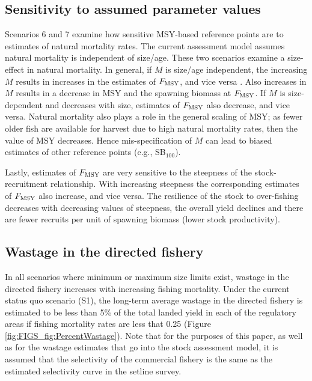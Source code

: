 \subsection*{Sensitivity to assumed parameter values} %
\label{sub:sensitivity_to_assumed_parameter_values}
Scenarios 6 and 7 examine how sensitive MSY-based reference points are to estimates of natural mortality rates.  The current assessment model assumes natural mortality is independent of size/age.  These two scenarios examine a size-effect in natural mortality.  In general, if $M$ is size/age independent, the increasing $M$ results in increases in the estimates of $F_{\rm{MSY}}$, and vice versa \citep{WalMart2004}.  Also increases in $M$ results in a decrease in MSY and the spawning biomass at $F_{\rm{MSY}}$.  If $M$ is size-dependent and decreases with size, estimates of $F_{\rm{MSY}}$  also decrease, and vice versa.  Natural mortality also plays a role in the general scaling of MSY; as fewer older fish are available for harvest due to high natural mortality rates, then the value of MSY decreases.  Hence mis-specification of $M$ can lead to biased estimates of other reference points (e.g., SB$_{100}$).

Lastly, estimates of $F_{\rm{MSY}}$ are very sensitive to the steepness of the stock-recruitment relationship.  With increasing steepness the corresponding estimates of $F_{\rm{MSY}}$ also increase, and vice versa.  The resilience of the stock to over-fishing decreases with decreasing values of steepness,  the overall yield declines and there are fewer recruits per unit of spawning biomass (lower stock productivity).


\subsection*{Wastage in the directed fishery} %
\label{sub:wastage_in_the_directed_fishery}

In all scenarios where minimum or maximum size limits exist, wastage in the directed fishery increases with increasing fishing mortality.  Under the current status quo scenario (S1), the long-term average wastage in the directed fishery is estimated to be less than 5\% of the total landed yield in each of the regulatory areas if fishing mortality rates are  less that 0.25 (Figure \ref{fig:FIGS_fig:PercentWastage}). Note that for the purposes of this paper, as well as for the wastage estimates that go into the stock assessment model, it is assumed that the selectivity of the commercial fishery is the same as the estimated selectivity curve in the setline survey.

